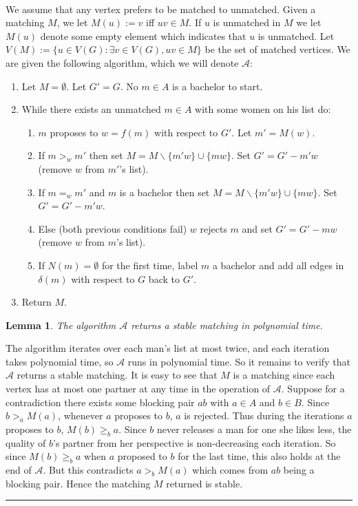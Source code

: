 \documentclass[letterpaper,12pt,oneside,onecolumn]{article}
\newcommand{\cA}{\mathcal{A}} \newcommand{\cB}{\mathcal{B}}
\newenvironment{proof}{{\bf Proof:  }}{\hfill\rule{2mm}{2mm}}
\newtheorem{lemma}[fact]{Lemma}
\begin{document}
\paragraph{}
We assume that any vertex prefers to be matched to unmatched. Given a matching $M$, we let $M(u) := v$ iff $uv \in M$. If $u$ is unmatched in $M$ we let $M(u)$ denote some empty element which indicates that $u$ is unmatched. Let $V(M):= \{ u \in V(G): \exists v \in V(G), uv \in M\}$ be the set of matched vertices. We are given the following algorithm, which we will denote $\cA$:
\begin{enumerate}
\item Let $M = \emptyset$. Let $G' = G$. No $m \in A$ is a bachelor to start.
\item While there exists an unmatched $m \in A$ with some women on his list do:
	\begin{enumerate}
	\item $m$ proposes to $w = f(m)$ with respect to $G'$. Let $m' = M(w)$.
	\item If $m >_w m'$ then set $M = M\backslash \{m'w\} \cup \{mw\}$. Set $G' = G' - m'w$ (remove $w$ from $m'$'s list).
	\item If $m =_w m'$ and $m$ is a bachelor then set $M = M\backslash \{m'w\} \cup \{mw\}$. Set $G' = G'-m'w$.
	\item Else (both previous conditions fail) $w$ rejects $m$ and set $G' = G' -mw$ (remove $w$ from $m$'s list). 
	\item If $N(m) = \emptyset$ for the first time, label $m$ a bachelor and add all edges in $\delta(m)$ with respect to $G$ back to $G'$.
	\end{enumerate}
\item Return $M$.
\end{enumerate}
\begin{lemma}\label{lemma:4poly}
The algorithm $\cA$ returns a stable matching in polynomial time.
\end{lemma}
\begin{proof}
The algorithm iterates over each man's list at most twice, and each iteration takes polynomial time, so $\cA$ runs in polynomial time. So it remains to verify that $\cA$ returns a stable matching. It is easy to see that $M$ is a matching since each vertex has at most one partner at any time in the operation of $\cA$. Suppose for a contradiction there exists some blocking pair $ab$ with $a \in A$ and $b \in B$. Since $b >_a M(a)$, whenever $a$ proposes to $b$, $a$ is rejected. Thus during the iterations $a$ proposes to $b$, $M(b) \geq_b a$. Since $b$ never releases a man for one she likes less, the quality of $b$'s partner from her perspective is non-decreasing each iteration. So since $M(b) \geq_b a$ when $a$ proposed to $b$ for the last time, this also holds at the end of $\cA$. But this contradicts $a>_b M(a)$ which comes from $ab$ being a blocking pair. Hence the matching $M$ returned is stable. 
\end{proof}
\end{document}
